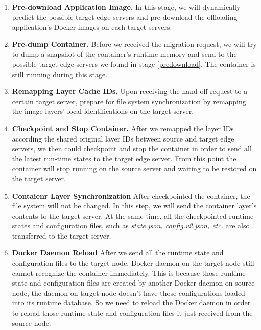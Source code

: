 \begin{enumerate}[label=\textbf{S\arabic*}]

\item \label{predownload}\textbf{Pre-download Application Image.} In this stage, we will dynamically predict the possible target edge servers and pre-download the offloading application's Docker images on each target servers.

\item \label{predump} \textbf{Pre-dump Container.} Before we received the migration request, we will try to dump a snapshot of the container's runtime memory and send to the possible target edge servers we found in stage \ref{predownload}. The container is still running during this stage. 

\item \label{prepare} \textbf{Remapping Layer Cache IDs.} Upon receiving the hand-off request to a certain target server, prepare for file system synchronization by remapping the image layers' local identifications on the target server.


\item \label{checkpoint} \textbf{Checkpoint and Stop Container.} After we remapped the layer IDs according the shared original layer IDs between source and target edge servers, we then could checkpoint and stop the container in order to send all the latest run-time states to the target edge server.
From this point the container will stop running on the source server and waiting to be restored on the target server.

\item \label{fs-sync} \textbf{Contaienr Layer Synchronization} After checkpointed the container, the file system will not be changed. In this step, we will send the container layer's contents to the target server. At the same time, all the checkpointed runtime states and configuration files, such as \textit{state.json, config.v2.json, etc.} are also transferred to the target server. 

\item \label{daemon-Reload} \textbf{Docker Daemon Reload} After we send all the runtime state and configuration files to the target node, Docker daemon on the target node still cannot recognize the container immediately.  This is because those runtime state and configuration files are created by another Docker daemon on source node, the daemon on target node doesn't have those configurations loaded into its runtime database. So we need to reload the Docker daemon in order to reload those runtime state and configuration files it just received from the source node.


\end{enumerate}
